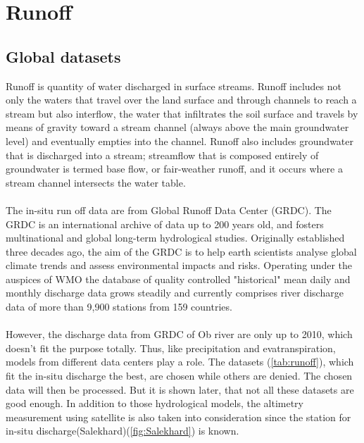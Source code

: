 \section{Runoff}\label{sec:runoff}
\subsection{Global datasets}
Runoff is quantity of water discharged in surface streams. Runoff includes not only the waters that travel over the land surface and through channels to reach a stream but also interflow, the water that infiltrates the soil surface and travels by means of gravity toward a stream channel (always above the main groundwater level) and eventually empties into the channel. Runoff also includes groundwater that is discharged into a stream; streamflow that is composed entirely of groundwater is termed base flow, or fair-weather runoff, and it occurs where a stream channel intersects the water table.\\\\
The in-situ run off data are from Global Runoff Data Center (GRDC). The GRDC is an international archive of data up to 200 years old, and fosters multinational and global long-term hydrological studies. Originally established three decades ago, the aim of the GRDC is to help earth scientists analyse global climate trends and assess environmental impacts and risks. Operating under the auspices of WMO the database of quality controlled "historical" mean daily and monthly discharge data grows steadily and currently comprises river discharge data of more than 9,900 stations from 159 countries.\\\\
However, the discharge data from GRDC of Ob river are only up to 2010, which doesn't fit the purpose totally. Thus, like precipitation and evatranspiration, models from different data centers play a role. The datasets (\ref{tab:runoff}), which fit the in-situ discharge the best, are chosen while others are denied. The chosen data will then be processed. But it is shown later, that not all these datasets are good enough. In addition to those hydrological models, the altimetry measurement using satellite is also taken into consideration since the station for in-situ discharge(Salekhard)(\ref{fig:Salekhard}) is known. 
